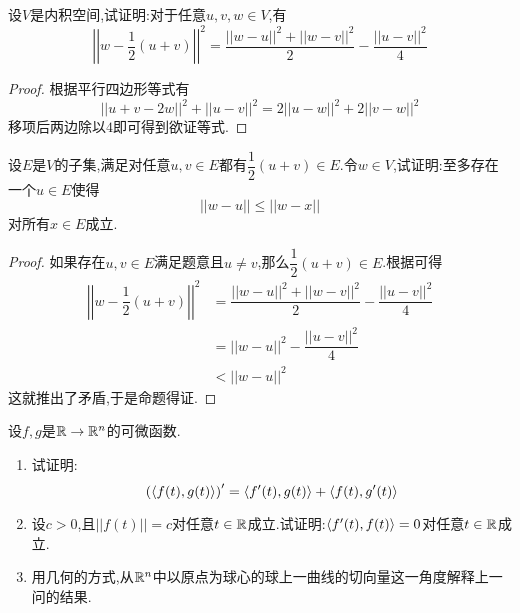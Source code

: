 \documentclass{ctexart}
\begin{document}
\begin{problem}[31.]
    设$V$是内积空间,试证明:对于任意$u,v,w\in V$,有
    \[\left|\left|w-\dfrac{1}{2}(u+v)\right|\right|^2=\dfrac{||w-u||^2+||w-v||^2}{2}-\dfrac{||u-v||^2}{4}\]
\end{problem}
\begin{proof}
    根据平行四边形等式有
    \[||u+v-2w||^2+||u-v||^2=2||u-w||^2+2||v-w||^2\]
    移项后两边除以$4$即可得到欲证等式.
\end{proof}
\begin{problem}[32.]
    设$E$是$V$的子集,满足对任意$u,v\in E$都有$\dfrac{1}{2}(u+v)\in E$.令$w\in V$,试证明:至多存在一个$u\in E$使得
    \[||w-u||\leqslant||w-x||\]
    对所有$x\in E$成立.
\end{problem}
\begin{proof}
    如果存在$u,v\in E$满足题意且$u\neq v$,那么$\dfrac12(u+v)\in E$.根据可得
    \[\begin{aligned}
        \left|\left|w-\dfrac12{(u+v)}\right|\right|^2
        &= \dfrac{||w-u||^2+||w-v||^2}{2}-\dfrac{||u-v||^2}{4} \\\
        &= ||w-u||^2-\dfrac{||u-v||^2}{4} \\
        &< ||w-u||^2
    \end{aligned}\]
    这就推出了矛盾,于是命题得证.
\end{proof}
\begin{problem}[33.]
    设$f,g$是$\mathbb{R}\to\mathbb{R}^n$的可微函数.
    \begin{enumerate}[label=\tbf{(\arabic*)}]
        \item 试证明:
            \[\left(\left\langle{f(t)},{g(t)}\right\rangle\right)'=\left\langle{f'(t)},{g(t)}\right\rangle+\left\langle{f(t)},{g'(t)}\right\rangle\]
        \item 设$c>0$,且$||f(t)||=c$对任意$t\in\mathbb{R}$成立.试证明:$\left\langle{f'(t)},{f(t)}\right\rangle=0$对任意$t\in\mathbb{R}$成立.
        \item 用几何的方式,从$\mathbb{R}^n$中以原点为球心的球上一曲线的切向量这一角度解释上一问的结果.
    \end{enumerate}
\end{problem}
\end{document}
